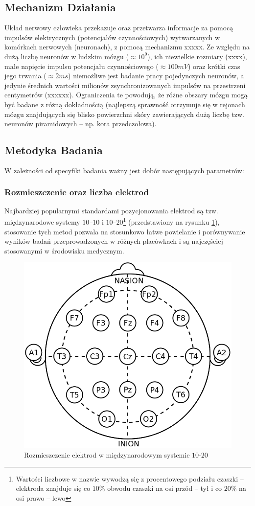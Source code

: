 \documentclass{./assets/wfis}
\begin{document}
\subsection{Mechanizm Działania}
Układ nerwowy człowieka przekazuje oraz przetwarza informacje za pomocą impulsów elektrycznych (potencjałów czynnościowych) wytwarzanych w komórkach nerwowych (neuronach), z pomocą mechanizmu xxxxx. Ze względu na dużą liczbę neuronów w ludzkim mózgu ($\approx10^9$\cite{herculano-houzel_human_2009}), ich niewielkie rozmiary (xxxx), małe napięcie impulsu potencjału czynnościowego ($\approx100mV$\cite{biga_anatomy_2019}) oraz krótki czas jego trwania ($\approx2ms$\cite{biga_anatomy_2019}) niemożliwe jest badanie pracy pojedynczych neuronów, a jedynie średnich wartości milionów zsynchronizowanych impulsów na przestrzeni centymetrów (xxxxxx). Ograniczenia te powodują, że różne obszary mózgu mogą być badane z różną dokładnością (najlepszą sprawność otrzymuje się w rejonach mózgu znajdujących się blisko powierzchni skóry zawierających dużą liczbę tzw. neuronów piramidowych \cite{}– np. kora przedczołowa\cite{}).

\subsection{Metodyka Badania}
W zależności od specyfiki badania ważny jest dobór następujących parametrów:

\subsubsection{Rozmieszczenie oraz liczba elektrod}
Najbardziej popularnymi standardami pozycjonowania elektrod są tzw. międzynarodowe systemy $10$–$10$ i $10$–$20$\footnote{Wartości liczbowe w nazwie wywodzą się  z procentowego podziału czaszki – elektroda znajduje się co $10\%$ obwodu czaszki na osi przód – tył i co $20\%$ na osi prawo – lewo} \cite{herbert_h_jasper_report_1958} (przedstawiony na rysunku \ref{fig:10-20-system}), stosowanie tych metod pozwala na stosunkowo łatwe powielanie i porównywanie wyników badań przeprowadzonych w różnych placówkach i są najczęściej stosowanymi w środowisku medycznym. 

\begin{figure}[h]
    \centering
    \includegraphics[width=0.5\columnwidth]{thesis/assets/10-20_system_electrodes.png}
    \caption{Rozmieszczenie elektrod w międzynarodowym systemie $10$-$20$}
    \label{fig:10-20-system}
\end{figure}
\end{document}
